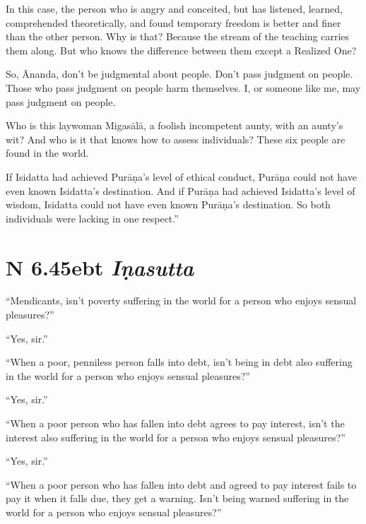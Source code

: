 \documentclass[12pt,openany]{book}%
\newcommand*{\suttatitleacronym}[1]{\smaller[2]{#1}\vspace*{.3em}}
\newcommand*{\suttatitletranslation}[1]{\linebreak{#1}}
\newcommand*{\suttatitleroot}[1]{\linebreak\smaller[2]\itshape{#1}}
\newcommand*{\tocacronym}[1]{\hspace*{-3.3em}{#1}\quad}
\newcommand*{\toctranslation}[1]{#1}
\newcommand*{\tocroot}[1]{(\textit{#1})}
\begin{document}
In this case, the person who is angry and conceited, but has listened, learned, comprehended theoretically, and found temporary freedom is better and finer than the other person. Why is that? Because the stream of the teaching carries them along. But who knows the difference between them except a Realized One? 

So, Ānanda, don’t be judgmental about people. Don’t pass judgment on people. Those who pass judgment on people harm themselves. I, or someone like me, may pass judgment on people. 

Who is this laywoman \textsanskrit{Migasālā}, a foolish incompetent aunty, with an aunty’s wit? And who is it that knows how to assess individuals? These six people are found in the world. 

If Isidatta had achieved \textsanskrit{Purāṇa}’s level of ethical conduct, \textsanskrit{Purāṇa} could not have even known Isidatta’s destination. And if \textsanskrit{Purāṇa} had achieved Isidatta’s level of wisdom, Isidatta could not have even known \textsanskrit{Purāṇa}’s destination. So both individuals were lacking in one respect.” 

%
\section*{{\suttatitleacronym AN 6.45}{\suttatitletranslation Debt }{\suttatitleroot Iṇasutta}}
\addcontentsline{toc}{section}{\tocacronym{AN 6.45} \toctranslation{Debt } \tocroot{Iṇasutta}}

“Mendicants, isn’t poverty suffering in the world for a person who enjoys sensual pleasures?” 

“Yes, sir.” 

“When a poor, penniless person falls into debt, isn’t being in debt also suffering in the world for a person who enjoys sensual pleasures?” 

“Yes, sir.” 

“When a poor person who has fallen into debt agrees to pay interest, isn’t the interest also suffering in the world for a person who enjoys sensual pleasures?” 

“Yes, sir.” 

“When a poor person who has fallen into debt and agreed to pay interest fails to pay it when it falls due, they get a warning. Isn’t being warned suffering in the world for a person who enjoys sensual pleasures?” 
\end{document}
